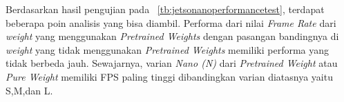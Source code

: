 \FloatBarrier

\par Berdasarkan hasil pengujian pada ~\ref{tb:jetsonanoperformancetest}, terdapat beberapa poin analisis yang bisa diambil.
Performa dari nilai \emph{Frame Rate} dari \emph{weight} yang menggunakan \emph{Pretrained Weights} dengan pasangan bandingnya di \emph{weight}
yang tidak menggunakan \emph{Pretrained Weights} memiliki performa yang tidak berbeda jauh. Sewajarnya, varian \emph{Nano (N)} dari
\emph{Pretrained Weight} atau \emph{Pure Weight} memiliki FPS paling tinggi dibandingkan varian diatasnya yaitu S,M,dan L.
